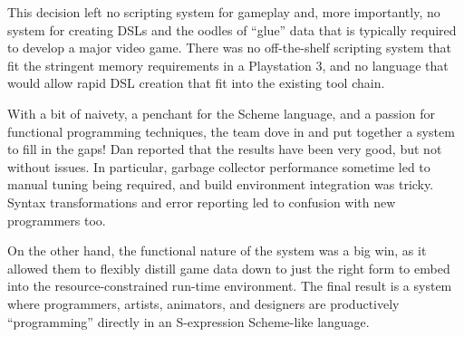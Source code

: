 \documentclass{jfp1}
\begin{document}
This decision left no scripting system for gameplay and, more importantly, no
system for creating DSLs and the oodles of “glue” data that is typically
required to develop a major video game. There was no off-the-shelf scripting
system that fit the stringent memory requirements in a Playstation 3, and no
language that would allow rapid DSL creation that fit into the existing tool
chain.

With a bit of naivety, a penchant for the Scheme language, and a passion for
functional programming techniques, the team dove in and put together a system
to fill in the gaps!  Dan reported that the results have been very good, but
not without issues.  In particular, garbage collector performance sometime
led to manual tuning being required, and build environment integration was
tricky. Syntax transformations and error reporting led to confusion with new
programmers too. 

On the other hand, the functional nature of the system was a big win, as it
allowed them to flexibly distill game data down to just the right form to embed
into the resource-constrained run-time environment.  The final result is a
system where programmers, artists, animators, and designers are productively
``programming'' directly in an S-expression Scheme-like language.
\end{document}
